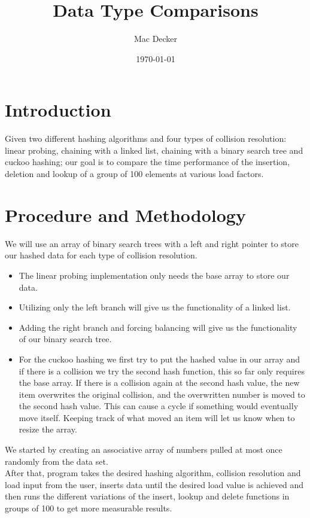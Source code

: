 \documentclass[11pt]{article}
\theoremstyle{definition}
\numberwithin{equation}{section}
\begin{document}
\title{Data Type Comparisons}
\author{Mac Decker} 
\date{\today}

\maketitle

\section{Introduction}
Given two different hashing algorithms and four types of collision resolution: linear probing, chaining with a linked list, chaining with a binary search tree and cuckoo hashing; our goal is to compare the time performance of the insertion, deletion and lookup of a group of 100 elements at various load factors. 

\section{Procedure and Methodology}
We will use an array of binary search trees with a left and right pointer to store our hashed data for each type of collision resolution. 
\begin{itemize}
	\item The linear probing implementation only needs the base array to store our data. 
	\item Utilizing only the left branch will give us the functionality of a linked list.
	\item Adding the right branch and forcing balancing will give us the functionality of our binary search tree. 
	\item For the cuckoo hashing we first try to put the hashed value in our array and if there is a collision we try the second hash function, this so far only requires the base array. If there is a collision again at the second hash value, the new item overwrites the original collision, and the overwritten number is moved to the second hash value. This can cause a cycle if something would eventually move itself. Keeping track of what moved an item will let us know when to resize the array.
\end{itemize} 

We started by creating an associative array of numbers pulled at most once randomly from the data set.
\\
After that, program takes the desired hashing algorithm, collision resolution and load input from the user, inserts data until the desired load value is achieved and then runs the different variations of the insert, lookup and delete functions in groups of 100 to get more measurable results.
\end{document}
